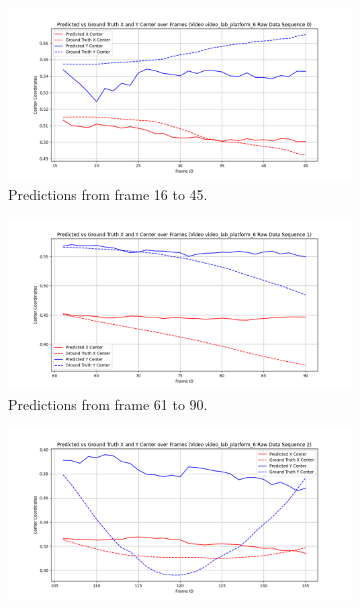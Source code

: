 \documentclass[12pt,oneside]{book} %
\begin{document}
\begin{figure}[H]
    \centering
    \begin{subfigure}[t]{0.45\textwidth}
        \includegraphics[width=\textwidth]{figures/framework/video_lab_platform_6 Raw Data - 0.png}
        \caption{Predictions from frame 16 to 45.}
        \label{fig:framework-video_lab_platform_6-0}
    \end{subfigure}
    \hfill
    \begin{subfigure}[t]{0.45\textwidth}
        \includegraphics[width=\textwidth]{figures/framework/video_lab_platform_6 Raw Data - 1.png}
        \caption{Predictions from frame 61 to 90.}
        \label{fig:framework-video_lab_platform_6-1}
    \end{subfigure}
    \vfill
    \begin{subfigure}[t]{0.45\textwidth}
        \includegraphics[width=\textwidth]{figures/framework/video_lab_platform_6 Raw Data - 2.png}

\end{subfigure}
\end{figure}
\end{document}
